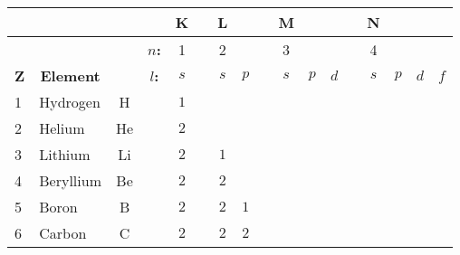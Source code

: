 	\begin{table}[H]
		\begin{center}
				\begin{tabular}{|l|lc|c|c|c|c|c|c|c|c|c|c|c|c|c|c|}
					\hline
					 \cellcolor{black!30} & \cellcolor{black!30} & \cellcolor{black!30} & \cellcolor{black!30}  & \multicolumn{1}{c}{\cellcolor{black!30}\textbf{K}} & \cellcolor{black!30} & \multicolumn{1}{c}{\cellcolor{black!30}\textbf{L}} & \cellcolor{black!30} & \cellcolor{black!30} & \multicolumn{1}{c}{\cellcolor{black!30}\textbf{M}} & \cellcolor{black!30} & \cellcolor{black!30} & \cellcolor{black!30} & \multicolumn{1}{c}{\cellcolor{black!30}\textbf{N}} & \cellcolor{black!30} & \cellcolor{black!30} & \cellcolor{black!30}\\ \hline
	  				\cellcolor{black!30} & \cellcolor{black!30} & \cellcolor{black!30} &  \multicolumn{1}{c}{\cellcolor{black!30}\textbf{$n$:}} & \multicolumn{1}{c}{\cellcolor{black!30}1} & \cellcolor{black!30} & \multicolumn{1}{c}{\cellcolor{black!30}2} & \cellcolor{black!30} & \cellcolor{black!30} & \multicolumn{1}{c}{\cellcolor{black!30}3} & \cellcolor{black!30} & \cellcolor{black!30} & \cellcolor{black!30} & \multicolumn{1}{c}{\cellcolor{black!30}4} & \cellcolor{black!30} & \cellcolor{black!30} & \cellcolor{black!30} \\ \hline
	  				\multicolumn{1}{c}{\cellcolor{black!30}\textbf{Z}} & 
	  \multicolumn{1}{c}{\cellcolor{black!30}\textbf{Element}} & \cellcolor{black!30} & 
	  \multicolumn{1}{c}{\cellcolor{black!30}\textbf{$l$:}} & \multicolumn{1}{c}{\cellcolor{black!30}$s$} & \cellcolor{black!30} & \multicolumn{1}{c}{\cellcolor{black!30}$s$} & \multicolumn{1}{c}{\cellcolor{black!30}$p$} & \cellcolor{black!30} & \multicolumn{1}{c}{\cellcolor{black!30}$s$} & \multicolumn{1}{c}{\cellcolor{black!30}$p$} & \multicolumn{1}{c}{\cellcolor{black!30}$d$} & \cellcolor{black!30} & \multicolumn{1}{c}{\cellcolor{black!30}$s$} & \multicolumn{1}{c}{\cellcolor{black!30}$p$} & \multicolumn{1}{c}{\cellcolor{black!30}$d$} & \multicolumn{1}{c}{\cellcolor{black!30}$f$} \\ \hline
				1 & Hydrogen & H & & $1$  \\ \hline
				2 & Helium & He & & $2$ \\ \hline
				3 & Lithium & Li & & $2$ & & $1$ \\ \hline
				4 & Beryllium & Be & &  $2$ & & $2$ \\ \hline
				5 & Boron & B & & $2$ & & $2$ & $1$ \\ \hline
				6 & Carbon & C & & $2$ & & $2$ & $2$ \\ \hline

\end{tabular}
\end{center}
\end{table}
